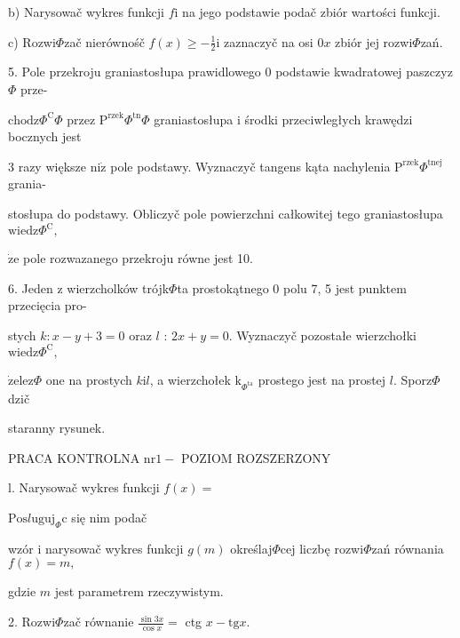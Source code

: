 \documentclass[a4paper,12pt]{article}
\begin{document}
b) Narysowač wykres funkcji $f\mathrm{i}$ na jego podstawie podač zbiór wartości funkcji.

c) Rozwi$\Phi$zač nierównośč $f(x)\displaystyle \geq-\frac{1}{2}\mathrm{i}$ zaznaczyč na osi $0x$ zbiór jej rozwi$\Phi$zań.

5. Pole przekroju graniastosłupa prawidlowego $0$ podstawie kwadratowej paszczyz$\Phi$ prze-

$\mathrm{c}\mathrm{h}\mathrm{o}\mathrm{d}\mathrm{z}\Phi^{\mathrm{C}}\Phi$ przez $\mathrm{P}^{\mathrm{r}\mathrm{z}\mathrm{e}\mathrm{k}}\Phi^{\mathrm{t}\mathrm{n}}\Phi$ graniastosłupa $\mathrm{i}$ środki przeciwległych krawędzi bocznych jest

3 razy większe $\mathrm{n}\mathrm{i}\dot{\mathrm{z}}$ pole podstawy. Wyznaczyč tangens kąta nachylenia $\mathrm{P}^{\mathrm{r}\mathrm{z}\mathrm{e}\mathrm{k}}\Phi^{\mathrm{t}\mathrm{n}\mathrm{e}\mathrm{j}}$ grania-

stosłupa do podstawy. Obliczyč pole powierzchni całkowitej tego graniastosłupa $\mathrm{w}\mathrm{i}\mathrm{e}\mathrm{d}\mathrm{z}\Phi^{\mathrm{C}},$

$\dot{\mathrm{z}}\mathrm{e}$ pole rozwazanego przekroju równe jest 10.

6. Jeden $\mathrm{z}$ wierzcholków trójk$\Phi$ta prostokątnego $0$ polu 7, 5 jest punktem przecięcia pro-

stych $k:x-y+3=0$ oraz $l$ : $2x+y=0$. Wyznaczyč pozostałe wierzchołki $\mathrm{w}\mathrm{i}\mathrm{e}\mathrm{d}\mathrm{z}\Phi^{\mathrm{C}},$

$\dot{\mathrm{z}}\mathrm{e}\mathrm{l}\mathrm{e}\mathrm{z}\Phi$ one na prostych $k\mathrm{i}l$, a wierzchołek $\mathrm{k}_{\Phi^{\mathrm{t}\mathrm{a}}}$ prostego jest na prostej $l$. Sporz$\Phi$dzič

staranny rysunek.




PRACA KONTROLNA $\mathrm{n}\mathrm{r} 1 -$ POZIOM ROZSZERZONY

l. Narysowač wykres funkcji $f(x)=$ 

$\mathrm{P}\mathrm{o}\mathrm{s}l\mathrm{u}\mathrm{g}\mathrm{u}\mathrm{j}_{\Phi}\mathrm{c}$ się nim podač

wzór $\mathrm{i}$ narysowač wykres funkcji $g(m)$ określaj$\Phi$cej liczbę rozwi$\Phi$zań równania $f(x)=m,$

gdzie $m$ jest parametrem rzeczywistym.

2. Rozwi$\Phi$zač równanie $\displaystyle \frac{\sin 3x}{\cos x}=$ ctg $x-\mathrm{t}\mathrm{g}x.$
\end{document}
